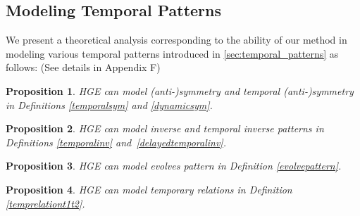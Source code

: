 \documentclass[letterpaper]{article} %
\newtheorem{theorem}{Theorem}
\newtheorem{proposition}{Proposition}
\begin{document}
\subsection{Modeling Temporal Patterns}
We present a theoretical analysis corresponding to the ability of our method in modeling various temporal patterns introduced in \ref{sec:temporal_patterns} as follows: (See details in Appendix F)
\begin{proposition}
HGE can model (anti-)symmetry and temporal (anti-)symmetry in Definitions \ref{temporalsym} and \ref{dynamicsym}. 
\label{th1:tempsym}
\end{proposition}

\begin{proposition}
HGE can model inverse and temporal inverse patterns in Definitions \ref{temporalinv} and~\ref{delayedtemporalinv}. 
\label{th1:tempinv}
\end{proposition}

\begin{proposition}
HGE can model evolves pattern in Definition \ref{evolvepattern}. 
\label{th1:tempevolv}
\end{proposition}

\begin{proposition}
HGE can model temporary relations in Definition \ref{temprelationt1t2}. 
\label{th1:tempevolv}
\end{proposition}







\end{document}
